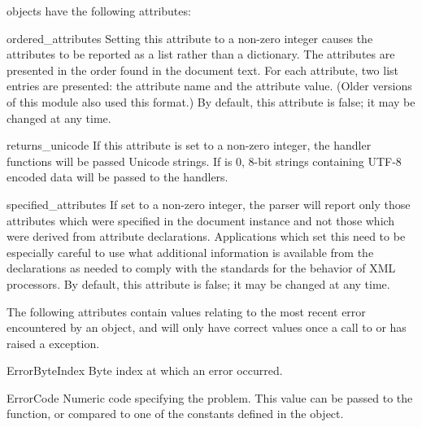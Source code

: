  objects have the following attributes:

\begin{memberdesc}[xmlparser]{ordered_attributes}
Setting this attribute to a non-zero integer causes the attributes to
be reported as a list rather than a dictionary.  The attributes are
presented in the order found in the document text.  For each
attribute, two list entries are presented: the attribute name and the
attribute value.  (Older versions of this module also used this
format.)  By default, this attribute is false; it may be changed at
any time.
\end{memberdesc}

\begin{memberdesc}[xmlparser]{returns_unicode} 
If this attribute is set to a non-zero integer, the handler functions
will be passed Unicode strings.  If  is 0,
8-bit strings containing UTF-8 encoded data will be passed to the
handlers.
\end{memberdesc}

\begin{memberdesc}[xmlparser]{specified_attributes}
If set to a non-zero integer, the parser will report only those
attributes which were specified in the document instance and not those
which were derived from attribute declarations.  Applications which
set this need to be especially careful to use what additional
information is available from the declarations as needed to comply
with the standards for the behavior of XML processors.  By default,
this attribute is false; it may be changed at any time.
\end{memberdesc}

The following attributes contain values relating to the most recent
error encountered by an  object, and will only have
correct values once a call to  or 
has raised a  exception.

\begin{memberdesc}[xmlparser]{ErrorByteIndex} 
Byte index at which an error occurred.
\end{memberdesc} 

\begin{memberdesc}[xmlparser]{ErrorCode} 
Numeric code specifying the problem.  This value can be passed to the
 function, or compared to one of the constants
defined in the  object.
\end{memberdesc}

